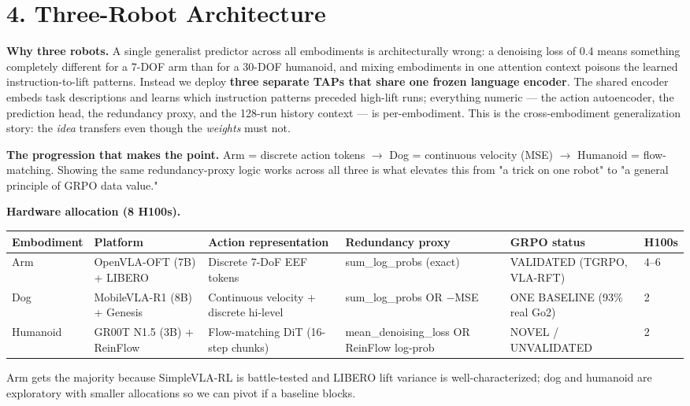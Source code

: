 \documentclass[11pt,letterpaper]{article}
\begin{document}
\medskip

\section*{4. Three-Robot Architecture}

\textbf{Why three robots.} A single generalist predictor across all embodiments is architecturally wrong: a denoising loss of 0.4 means something completely different for a 7-DOF arm than for a 30-DOF humanoid, and mixing embodiments in one attention context poisons the learned instruction-to-lift patterns. Instead we deploy \textbf{three separate TAPs that share one frozen language encoder}. The shared encoder embeds task descriptions and learns which instruction patterns preceded high-lift runs; everything numeric --- the action autoencoder, the prediction head, the redundancy proxy, and the 128-run history context --- is per-embodiment. This is the cross-embodiment generalization story: the \emph{idea} transfers even though the \emph{weights} must not.

\textbf{The progression that makes the point.} Arm = discrete action tokens $\rightarrow$ Dog = continuous velocity (MSE) $\rightarrow$ Humanoid = flow-matching. Showing the same redundancy-proxy logic works across all three is what elevates this from "a trick on one robot" to "a general principle of GRPO data value."

\textbf{Hardware allocation (8 H100s).}

\begin{center}
\begin{tabular}{llllll}
\toprule
Embodiment & Platform & Action representation & Redundancy proxy & GRPO status & H100s \\
\midrule
Arm & OpenVLA-OFT (7B) + LIBERO & Discrete 7-DoF EEF tokens & sum\_log\_probs (exact) & VALIDATED (TGRPO, VLA-RFT) & 4--6 \\
Dog & MobileVLA-R1 (8B) + Genesis & Continuous velocity + discrete hi-level & sum\_log\_probs OR $-$MSE & ONE BASELINE (93\% real Go2) & 2 \\
Humanoid & GR00T N1.5 (3B) + ReinFlow & Flow-matching DiT (16-step chunks) & mean\_denoising\_loss OR ReinFlow log-prob & NOVEL / UNVALIDATED & 2 \\
\bottomrule
\end{tabular}
\end{center}

Arm gets the majority because SimpleVLA-RL is battle-tested and LIBERO lift variance is well-characterized; dog and humanoid are exploratory with smaller allocations so we can pivot if a baseline blocks.
\end{document}
